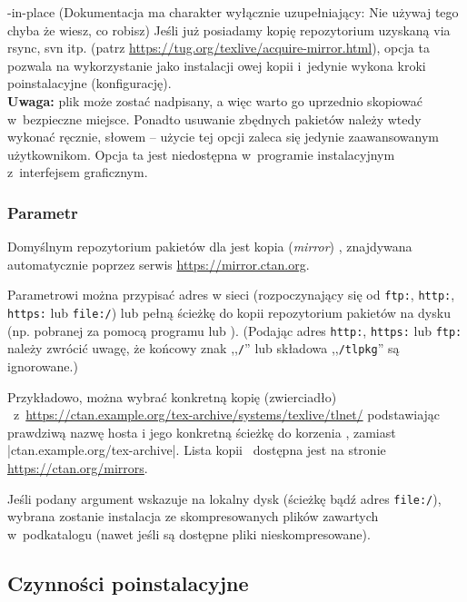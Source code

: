 \documentclass{article}
\begin{document}
\begin{ttdescription}
\item[-in-place](Dokumentacja ma charakter wyłącznie uzupełniający: Nie używaj tego
  chyba że wiesz, co robisz)
Jeśli już posiadamy kopię repozytorium \TL{} uzyskaną via
 rsync, svn itp. (patrz \url{https://tug.org/texlive/acquire-mirror.html}),
 opcja ta pozwala na wykorzystanie jako instalacji owej kopii i~jedynie
 wykona kroki poinstalacyjne (konfigurację). \\
 \textbf{Uwaga:} plik
  może zostać nadpisany, a więc warto go
 uprzednio skopiować w~bezpieczne miejsce. Ponadto usuwanie zbędnych pakietów
 należy wtedy wykonać  ręcznie, słowem -- użycie tej opcji zaleca się  jedynie
 zaawansowanym użytkownikom. Opcja ta jest niedostępna w~programie
 instalacyjnym z~interfejsem graficznym.
\end{ttdescription}

\subsubsection{Parametr }
\label{sec:location}

Domyślnym repozytorium pakietów dla \TL{} jest kopia (\textit{mirror}) \CTAN,
znajdywana automatycznie poprzez serwis \url{https://mirror.ctan.org}.

Parametrowi  można przypisać adres w sieci
(rozpoczynający się  od \texttt{ftp:}, \texttt{http:}, \texttt{https:} lub \texttt{file:/})
lub pełną ścieżkę do kopii repozytorium pakietów na dysku (np. pobranej za pomocą
programu  lub ). (Podając adres \texttt{http:}, \texttt{https:}
lub \texttt{ftp:} należy zwrócić uwagę, że końcowy znak ,,\texttt{/}'' lub składowa
,,\texttt{/tlpkg}'' są ignorowane.)

Przykładowo, można wybrać konkretną kopię (zwierciadło) \CTAN\
z~\url{https://ctan.example.org/tex-archive/systems/texlive/tlnet/} podstawiając
prawdziwą nazwę hosta i jego konkretną ścieżkę do korzenia \CTAN, zamiast
|ctan.example.org/tex-archive|. Lista kopii \CTAN\ dostępna jest na
stronie \url{https://ctan.org/mirrors}.

Jeśli podany argument wskazuje na lokalny dysk (ścieżkę bądź adres \texttt{file:/}), wybrana
zostanie instalacja ze skompresowanych plików  zawartych %
w~podkatalogu \dirname{archive} (nawet jeśli są dostępne pliki nieskompresowane).

\subsection{Czynności poinstalacyjne}
\label{sec:postinstall}
\end{document}
